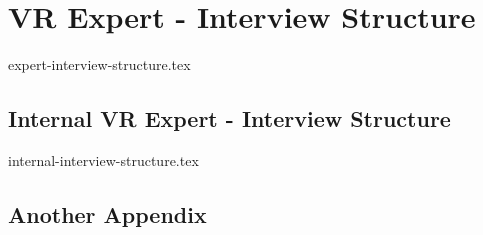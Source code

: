
\appendix
\chapter{VR Expert - Interview Structure}
\label{appendix:ex-interview-structure}
{expert-interview-structure.tex}


\section{Internal VR Expert - Interview Structure}
\label{appendix:in-interview-structure}
{internal-interview-structure.tex}

\section{Another Appendix}
\label{appendix:other}
